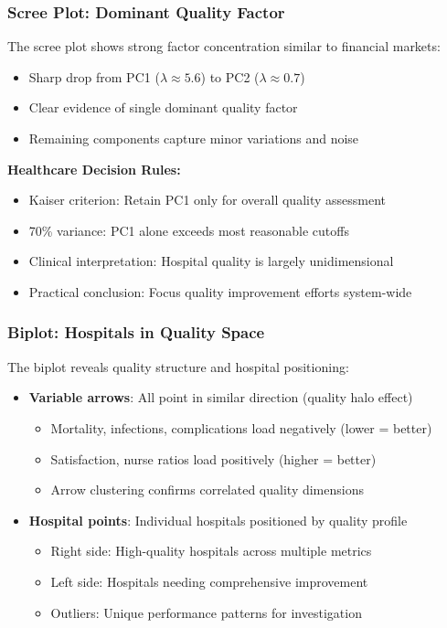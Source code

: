 \documentclass[aspectratio=169]{beamer}
\begin{document}
\begin{frame}
    \frametitle{Scree Plot: Dominant Quality Factor}
    The scree plot shows strong factor concentration similar to financial markets:
    \begin{itemize}
        \item Sharp drop from PC1 ($\lambda \approx 5.6$) to PC2 ($\lambda \approx 0.7$) \pause
        \item Clear evidence of single dominant quality factor \pause
        \item Remaining components capture minor variations and noise \pause
    \end{itemize}
    \vspace{12pt}
    \textbf{Healthcare Decision Rules:}
    \begin{itemize}
        \item Kaiser criterion: Retain PC1 only for overall quality assessment \pause
        \item 70\% variance: PC1 alone exceeds most reasonable cutoffs \pause
        \item Clinical interpretation: Hospital quality is largely unidimensional \pause
        \item Practical conclusion: Focus quality improvement efforts system-wide \pause
    \end{itemize}
\end{frame}

\begin{frame}
    \frametitle{Biplot: Hospitals in Quality Space}
    The biplot reveals quality structure and hospital positioning:
    \begin{itemize}
        \item \textbf{Variable arrows}: All point in similar direction (quality halo effect) \pause
              \begin{itemize}
                  \item Mortality, infections, complications load negatively (lower = better) \pause
                  \item Satisfaction, nurse ratios load positively (higher = better) \pause
                  \item Arrow clustering confirms correlated quality dimensions \pause
              \end{itemize}
        \item \textbf{Hospital points}: Individual hospitals positioned by quality profile \pause
              \begin{itemize}
                  \item Right side: High-quality hospitals across multiple metrics \pause
                  \item Left side: Hospitals needing comprehensive improvement \pause
                  \item Outliers: Unique performance patterns for investigation \pause
              \end{itemize}
    \end{itemize}
\end{frame}
\end{document}
